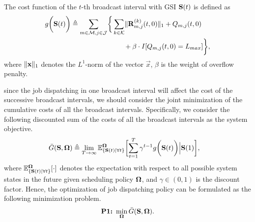 \begin{definition}
    The cost function of the $t$-th broadcast interval with GSI $\mathbf{S}(t)$ is defined as
    {\small
    \begin{align}
        g\Paren{\Stat(t)} \define
            \sum_{m\in\esSet,j\in\jSpace}
            \Brace{&
                \sum_{k\in\apSet} \Inorm{\vec{R}^{(k)}_{m,j}(t,0)} + Q_{m,j}(t,0)
                \nonumber\\
                &~~~~~+ \beta \cdot I[Q_{m,j}(t,0)=L_{max}]
            },
    \end{align}
    }%
    where $\lVert\mathbf{x}\|_1$ denotes the $L^1$-norm of the vector $\vec{x}$, $\beta$ is the weight of overflow penalty.
\end{definition}

since the job dispatching in one broadcast interval will affect the cost of the successive broadcast intervals, we should consider the joint minimization of the cumulative costs of all the broadcast intervals.
Specifically, we consider the following discounted sum of the costs of all the broadcast intervals as the system objective.
{\small
\begin{align}
    &\bar{G}(\Stat, \Policy) \define
    \lim_{T \to \infty} \mathbb{E}^{\Policy}_{\set{\Stat(t)|\forall t}}
    \Bracket{
        \sum_{t=1}^{T} \gamma^{t-1} g\Paren{\Stat(t)} \Big| \Stat(1)
    },
\end{align}
}%
where $\mathbb{E}^{\boldsymbol{\Omega}}_{\{\mathbf{S}(t)|\forall t\}}[\cdot]$ denotes the expectation with respect to all possible system states in the future given scheduling policy $\boldsymbol{\Omega}$, and $\gamma \in (0,1)$ is the discount factor.
Hence, the optimization of job dispatching policy can be formulated as the following minimization problem.
{\small
\begin{align}
    \textbf{P1:}~
    \min_{\boldsymbol{\Omega}} \bar{G}(\mathbf{S}, \boldsymbol{\Omega}).
\end{align}
}%

